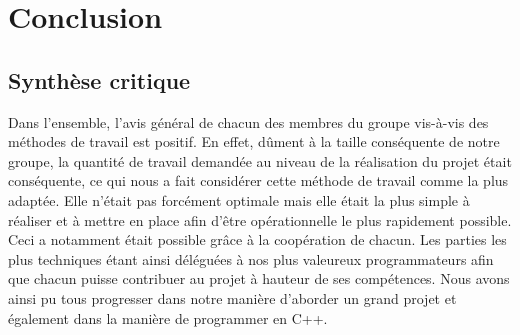 \chapter{Conclusion}
    \section{Synthèse critique}
        Dans l'ensemble, l'avis général de chacun des membres du groupe vis-à-vis des méthodes de travail est positif. En effet, dûment à la taille conséquente de notre groupe, la quantité de travail demandée au niveau de la réalisation du projet était conséquente, ce qui nous a fait considérer cette méthode de travail comme la plus adaptée. Elle n'était pas forcément optimale mais elle était la plus simple à réaliser et à mettre en place afin d'être opérationnelle le plus rapidement possible. Ceci a notamment était possible grâce à la coopération de chacun. Les parties les plus techniques étant ainsi déléguées à nos plus valeureux programmateurs afin que chacun puisse contribuer au projet à hauteur de ses compétences. Nous avons ainsi pu tous progresser dans notre manière d'aborder un grand projet et également dans la manière de programmer en C++.\\ 
